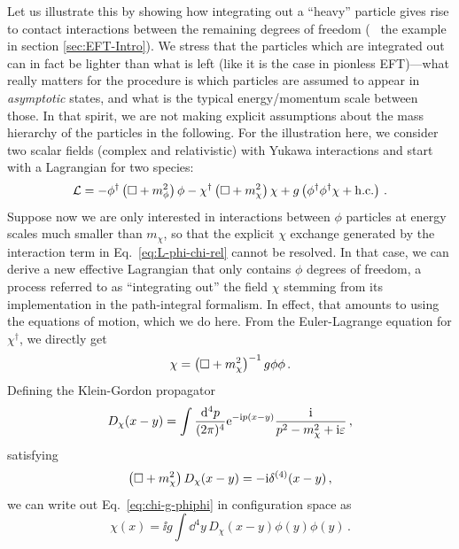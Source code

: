 Let us illustrate this by showing how integrating out a ``heavy'' 
particle gives rise to contact interactions between the remaining degrees 
of freedom (\cf~ the example in section \ref{sec:EFT-Intro}).  We 
stress that the particles which are integrated out can in fact be lighter than 
what is left (like it is the case in pionless EFT)---what really matters for 
the procedure is which particles are assumed to appear in \emph{asymptotic} 
states, and what is the typical energy/momentum scale between those.  In that 
spirit, we are not making explicit assumptions about the mass hierarchy of the 
particles in the following.  For the illustration here, we consider two scalar 
fields (complex and relativistic) with Yukawa interactions and start with a 
Lagrangian for two species:
%
\begin{equation}
 \LL = {-}\phi^\dagger\left(\dAlem + m_\phi^2\right)\phi
 - \chi^\dagger\left(\dAlem + m_\chi^2\right)\chi
 + g\left(\phi^\dagger\phi^\dagger\chi + \hc\right) \,.
\label{eq:L-phi-chi-rel}
\end{equation}
%
Suppose now we are only interested in interactions between $\phi$ particles 
at energy scales much smaller than $m_\chi$, so that the explicit 
$\chi$ exchange generated by the interaction term in 
Eq.~\eqref{eq:L-phi-chi-rel} cannot be resolved.  In that case, we can derive a 
new effective Lagrangian that only contains $\phi$ degrees of freedom, a 
process referred to as ``integrating out'' the field $\chi$ stemming from its 
implementation in the path-integral formalism.  In effect, that amounts to 
using the equations of motion, which we do here.  From the Euler-Lagrange 
equation for $\chi^\dagger$, we directly get
%
\begin{equation}
 \chi = \left(\dAlem + m_\chi^2\right)^{-1} g\phi\phi \,.
\label{eq:chi-g-phiphi}
\end{equation}
%
Defining the Klein-Gordon propagator
%
\begin{equation}
 D_\chi(x-y)
 = \int\frac{\dd^4p}{(2\pi)^4} \eex^{{-}\ii p(x-y)}
 \frac{\ii}{p^2-m_\chi^2 + \ii\eps} \,,
\label{eq:D-chi-KG}
\end{equation}
%
satisfying
%
\begin{equation}
 \left(\dAlem + m_\chi^2\right)D_\chi(x-y) = {-}\ii \delta^{(4)}(x-y) \,,
\label{eq:chi-GF}
\end{equation}
%
we can write out Eq.~\eqref{eq:chi-g-phiphi} in configuration space as
%
\begin{equation}
 \chi(x) = \ii g \int\dd^4y \, D_\chi(x-y) \phi(y) \phi(y) \,.
\end{equation}
